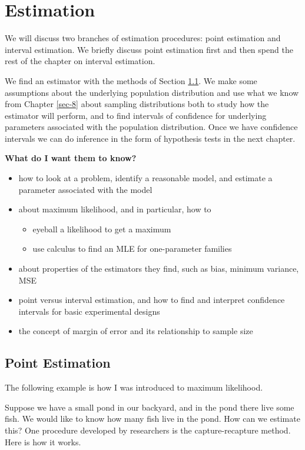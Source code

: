 \chapter{Estimation}
\label{sec-9}

\noindent
We will discuss two branches of estimation procedures: point
estimation and interval estimation. We briefly discuss point
estimation first and then spend the rest of the chapter on interval
estimation.

We find an estimator with the methods of Section
\ref{sec-9-1}. We make some assumptions about the
underlying population distribution and use what we know from Chapter
\ref{sec-8} about sampling
distributions both to study how the estimator will perform, and to
find intervals of confidence for underlying parameters associated with
the population distribution. Once we have confidence intervals we can
do inference in the form of hypothesis tests in the next chapter.

\textbf{What do I want them to know?}
\begin{itemize}
\item how to look at a problem, identify a reasonable model, and estimate
a parameter associated with the model
\item about maximum likelihood, and in particular, how to
\begin{itemize}
\item eyeball a likelihood to get a maximum
\item use calculus to find an MLE for one-parameter families
\end{itemize}
\item about properties of the estimators they find, such as bias, minimum
variance, MSE
\item point versus interval estimation, and how to find and interpret
confidence intervals for basic experimental designs
\item the concept of margin of error and its relationship to sample size
\end{itemize}

\section{Point Estimation}
\label{sec-9-1}

The following example is how I was introduced to maximum likelihood.

\label{exa-how-many-fish} Suppose we have a small pond in our backyard,
and in the pond there live some fish. We would like to know how many
fish live in the pond. How can we estimate this? One procedure
developed by researchers is the capture-recapture method. Here is how
it works.

